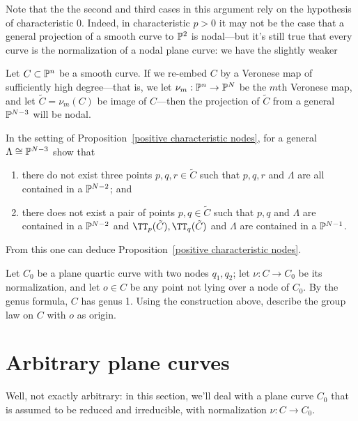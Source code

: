 Note that the the second and third cases in this argument rely on the hypothesis of characteristic 0. Indeed, in characteristic $p > 0$ it may not be the case that a general projection of a smooth curve to $\PP^2$ is nodal---but it's still true that every curve is the normalization of a nodal plane curve: we have the slightly weaker

\begin{proposition}\label{positive characteristic nodes}
Let $C\subset \PP^n$ be a smooth curve. If we re-embed $C$ by a Veronese map of sufficiently high degree---that is, we let $\nu_m : \PP^n \to \PP^N$ be the $m$th Veronese map, and let $\tilde C = \nu_m(C)$ be image of $C$---then the projection of $\tilde C$ from a general $\PP^{N-3}$ will be nodal.
\end{proposition}

\begin{exercise}
In the setting of Proposition~\ref{positive characteristic nodes}, for a general $\Lambda \cong \PP^{N-3}$ show that
\begin{enumerate}
\item there do not exist three points $p,q,r \in \tilde C$ such that $p, q, r$ and $\Lambda$ are all contained in a $\PP^{N-2}$; and
\item there does not exist a pair of points $p, q \in \tilde C$ such that 
$p, q$ and $\Lambda$ are contained in a $\PP^{N-2}$ and $\TT_p(\tilde C), \TT_q(\tilde C)$ and $\Lambda$ are contained in a $\PP^{N-1}$.
\end{enumerate}
\end{exercise}

From this one can deduce Proposition~\ref{positive characteristic nodes}.

\begin{exercise}
Let $C_0$ be a plane quartic curve with two nodes $q_1, q_2$; let $\nu : C \to C_0$ be its normalization, and let $o \in C$ be any point not lying over a node of $C_0$.
By the genus formula, $C$ has genus 1. Using the construction above, describe the group law on $C$ with $o$ as origin.
\end{exercise}

\section{Arbitrary plane curves}\label{arbitrary plane curves}

Well, not exactly arbitrary: in this section, we'll deal with a plane curve $C_0$ that is assumed to be reduced and irreducible, with normalization $\nu : C \to C_0$. 

